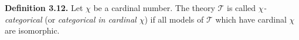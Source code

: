 \textbf{Definition 3.12.} Let $\chi$ be a cardinal number. The theory $\mathcal{T}$ is called \textit{$\chi$-categorical} (or \textit{categorical in cardinal $\chi$}) if all models of $\mathcal{T}$ which have cardinal $\chi$ are isomorphic.
